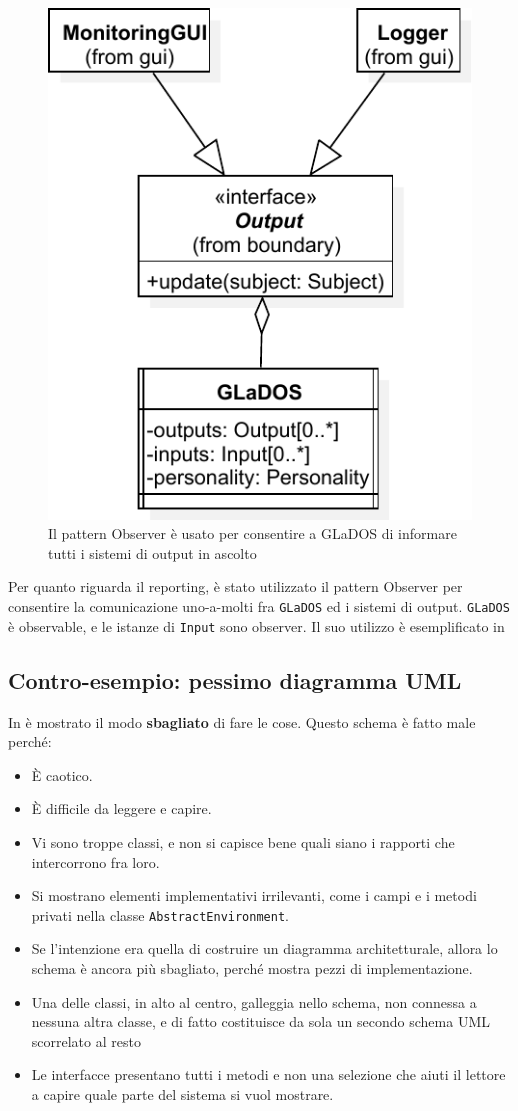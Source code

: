 \documentclass[a4paper,12pt]{report}
\begin{document}
\begin{figure}[h]
\centering{}
\includegraphics[width=.7\textwidth]{img/observer}
\caption{Il pattern Observer è usato per consentire a GLaDOS di informare tutti i sistemi di output in ascolto}
\label{img:observer}
\end{figure}

Per quanto riguarda il reporting, è stato utilizzato il pattern Observer per consentire la
comunicazione uno-a-molti fra \texttt{GLaDOS} ed i sistemi di output.
%
\texttt{GLaDOS} è observable, e le istanze di \texttt{Input} sono observer.
%
Il suo utilizzo è esemplificato in 

\subsection*{Contro-esempio: pessimo diagramma UML}

In  è mostrato il modo \textbf{sbagliato} di fare le cose.
%
Questo schema è fatto male perché:
\begin{itemize}
	\item È caotico.
	\item È difficile da leggere e capire.
	\item Vi sono troppe classi, e non si capisce bene quali siano i rapporti che intercorrono fra loro.
	\item Si mostrano elementi implementativi irrilevanti, come i campi e i metodi privati nella classe \texttt{AbstractEnvironment}.
	\item Se l'intenzione era quella di costruire un diagramma architetturale, allora lo schema è ancora più sbagliato, perché mostra pezzi di implementazione.
	\item Una delle classi, in alto al centro, galleggia nello schema, non connessa a nessuna altra classe, e di fatto costituisce da sola un secondo schema UML scorrelato al resto
	\item Le interfacce presentano tutti i metodi e non una selezione che aiuti il lettore a capire quale parte del sistema si vuol mostrare.
\end{itemize}
\end{document}

